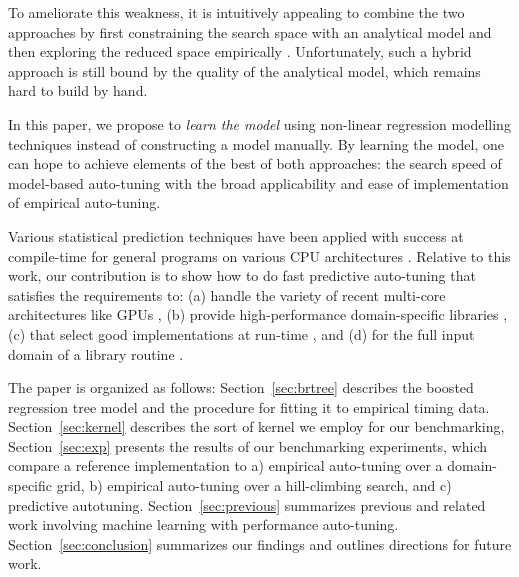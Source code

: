 \documentclass{sig-alternate}
\begin{document}

To ameliorate this weakness, it is intuitively appealing to combine the two
approaches by first constraining the search space with an analytical model and
then exploring the reduced space empirically \citep{chen2005combining,
li2009note}. Unfortunately, such a hybrid approach is still bound by the quality
of the analytical model, which remains hard to build by hand.


In this paper, we propose to \emph{learn the model} using non-linear regression
modelling techniques instead of constructing a model manually. By learning the model, one can
hope to achieve elements of the best of both approaches: the search speed of model-based auto-tuning with the broad applicability
and ease of implementation of empirical auto-tuning.

Various statistical prediction techniques have been applied with
success at compile-time for general programs on various CPU architectures
\citep{monsifrot2002machine, stephenson2003meta, yotov2003comparison,
kulkarni2004fast, cooper2005acme, franke2005probabilistic,
hutter2006performance, cavazos2007rapidly, cavazos2008intelligent,
hartono2009annotation, park2011evaluation, fursin2008milepost}.
Relative to this work, our contribution is to show
how to do fast predictive auto-tuning that satisfies the requirements to:
(a) handle the variety of recent multi-core architectures like GPUs \citep{schaa2009exploring},
(b) provide high-performance domain-specific libraries \citep{nukada2009auto, li2009note, kamil2010auto},
(c) that select good implementations at run-time \citep{klockner2011pycuda, pinto+cox:2011gcg}, and
(d) for the full input domain of a library routine \citep{liu2009cross, grauer2011optimizing}.

The paper is organized as follows:
Section~\ref{sec:brtree} describes the boosted regression tree model and the procedure for fitting it to empirical timing data.
Section~\ref{sec:kernel} describes the sort of kernel we employ for our benchmarking,
Section~\ref{sec:exp} presents the results of our benchmarking experiments, which
compare a reference implementation to a) empirical auto-tuning over a domain-specific grid,
b) empirical auto-tuning over a hill-climbing search, and
c) predictive autotuning.
Section~\ref{sec:previous} summarizes previous and related work involving  machine learning with performance auto-tuning.
Section~\ref{sec:conclusion} summarizes our findings and outlines directions for future work.
\end{document}
